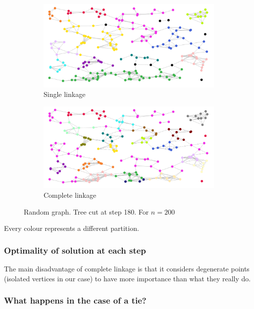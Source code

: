 \documentclass[12pt,a4paper]{article}
\begin{document}
\begin{figure}
  \centering
  \begin{subfigure}[h]{0.49\textwidth}
    \includegraphics[width=\linewidth]{img/slink-200-180.png}
    \caption{Single linkage}
  \end{subfigure}
  \begin{subfigure}[h]{0.49\textwidth}
    \includegraphics[width=\linewidth]{img/clink-200-180.png}
    \caption{Complete linkage}
  \end{subfigure}
  \caption{Random graph. Tree cut at step 180. For $n = 200$}
  \label{fig:slink-vs-clink2}
\end{figure}

Every colour represents a different partition.

\subsubsection{Optimality of solution at each step}

The main disadvantage of complete linkage is that it considers
degenerate points (isolated vertices in our case) to have more
importance than what they really do.

\subsubsection{What happens in the case of a tie?}
\end{document}
